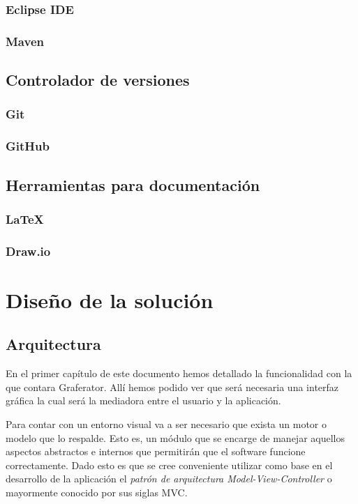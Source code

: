 \documentclass{book}
\begin{document}
\subsection{Eclipse IDE}


\subsection{Maven}




\section{Controlador de versiones}

\subsection{Git}

\subsection{GitHub}



\section{Herramientas para documentación}


\subsection{LaTeX}


\subsection{Draw.io}




%
%
\chapter{Diseño de la solución}


\section{Arquitectura}

	En el primer capítulo de este documento hemos detallado la funcionalidad con la que contara Graferator. Allí hemos podido ver que será necesaria una interfaz gráfica la cual será la mediadora entre el usuario y la aplicación. 
	\par
	Para contar con un entorno visual va a ser necesario que exista un motor o modelo que lo respalde. Esto es, un módulo que se encarge de manejar aquellos aspectos abstractos e internos que permitirán que el software funcione correctamente. Dado esto es que se cree conveniente utilizar como base en el desarrollo de la aplicación el \textit{patrón de arquitectura Model-View-Controller} o mayormente conocido por sus siglas MVC.
	\bigskip
\end{document}
